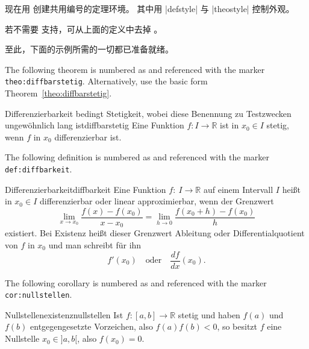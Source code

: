 
现在用  创建共用编号的定理环境。
其中用 |defstyle| 与 |theostyle| 控制外观。

\begin{marker}
若不需要  支持，可从上面的定义中去掉
。
\end{marker}


至此，下面的示例所需的一切都已准备就绪。

\begin{dispExample}
The following theorem is numbered as 
and referenced with the marker \texttt{theo:diffbarstetig}.
Alternatively, use the basic form Theorem~\ref{theo:diffbarstetig}.

\begin{Theorem}{Differenzierbarkeit bedingt Stetigkeit, wobei diese Benennung
  zu Testzwecken ungew\"{o}hnlich lang ist}{diffbarstetig}%
  Eine Funktion $f:I\to\mathbb{R}$ ist in $x_0\in I$ stetig, wenn $f$ in
  $x_0$ differenzierbar ist.
\end{Theorem}
\end{dispExample}


\begin{dispExample}
The following definition is numbered as  and
referenced with the marker \texttt{def:diffbarkeit}.\bigskip

\begin{Definition}{Differenzierbarkeit}{diffbarkeit}
  Eine Funktion $f:~I\to\mathbb{R}$ auf einem Intervall $I$ hei\ss{}t in
  $x_0\in I$ differenzierbar oder linear approximierbar,
  wenn der Grenzwert
  \begin{equation*}
  \lim\limits_{x\to x_0}\frac{f(x)-f(x_0)}{x-x_0}=
  \lim\limits_{h\to 0}\frac{f(x_0+h)-f(x_0)}{h}
  \end{equation*}
  existiert. Bei Existenz hei\ss{}t dieser Grenzwert Ableitung
  oder Differentialquotient von $f$ in $x_0$ und man
  schreibt f\"{u}r ihn
  \begin{equation*}
  f'(x_0)\quad\text{oder}\quad\frac{df}{dx}(x_0).
  \end{equation*}
\end{Definition}
\end{dispExample}


\begin{dispExample}
The following corollary is numbered as  and
referenced with the marker \texttt{cor:nullstellen}.\bigskip

\begin{Corollary}{Nullstellenexistenz}{nullstellen}
  Ist $f:[a,b]\to\mathbb{R}$ stetig und haben $f(a)$ und $f(b)$ entgegengesetzte
  Vorzeichen, also $f(a)f(b)<0$, so besitzt $f$ eine Nullstelle $x_0\in]a,b[$,
  also $f(x_0)=0$.
\end{Corollary}
\end{dispExample}


